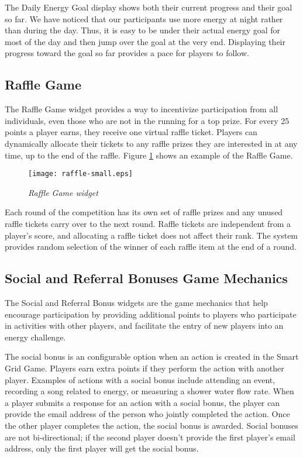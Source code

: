 The Daily Energy Goal display shows both their current progress and their goal so far. We have noticed that our participants use more energy at night rather than during the day. Thus, it is easy to be under their actual energy goal for most of the day and then jump over the goal at the very end. Displaying their progress toward the goal so far provides a pace for players to follow.

\subsection{Raffle Game}

The Raffle Game widget provides a way to incentivize participation from all individuals, even those who are not in the running for a top prize. For every 25 points a player earns, they receive one virtual raffle ticket. Players can dynamically allocate their tickets to any raffle prizes they are interested in at any time, up to the end of the raffle. Figure \ref{fig:RaffleGame} shows an example of the Raffle Game.


\begin{figure}[th]
  \center
  \texttt{[image: raffle-small.eps]}
  \caption{\em Raffle Game widget}
  \label{fig:RaffleGame}
\end{figure}

Each round of the competition has its own set of raffle prizes and any unused raffle tickets carry over to the next round. Raffle tickets are independent from a player's score, and allocating a raffle ticket does not affect their rank. The system provides random selection of the winner of each raffle item at the end of a round.

\subsection{Social and Referral Bonuses Game Mechanics}

The Social and Referral Bonus widgets are the game mechanics that help encourage participation by providing additional points to players who participate in activities with other players, and facilitate the entry of new players into an energy challenge.

The social bonus is an configurable option when an action is created in the Smart Grid Game. Players earn extra points if they perform the action with another player. Examples of actions with a social bonus include attending an event, recording a song related to energy, or measuring a shower water flow rate. When a player submits a response for an action with a social bonus, the player can provide the email address of the person who jointly completed the action. Once the other player completes the action, the social bonus is awarded. Social bonuses are not bi-directional; if the second player doesn't provide the first player's email address, only the first player will get the social bonus.

